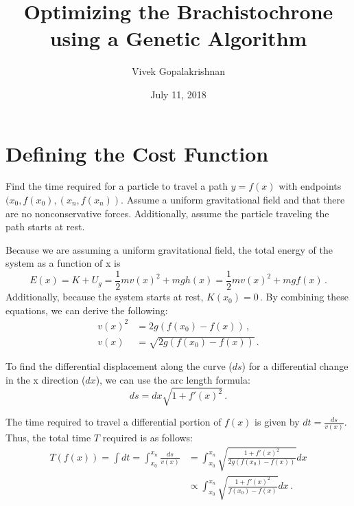 \documentclass{article}
\title{Optimizing the Brachistochrone using a Genetic Algorithm}
\author{Vivek Gopalakrishnan}
\date{July 11, 2018}
\begin{document}
\maketitle

\section{Defining the Cost Function}
Find the time required for a particle to travel a path $y=f(x)$ with endpoints $(x_0,f(x_0), (x_n, f(x_n))$. Assume a uniform gravitational field and that there are no nonconservative forces. Additionally, assume the particle traveling the path starts at rest.

Because we are assuming a uniform gravitational field, the total energy of the system as a function of x is
\begin{equation}
	E(x) = K + U_g = \frac{1}{2}mv(x)^2 + mgh(x) = \frac{1}{2}mv(x)^2 + mgf(x) \,.
\end{equation}
Additionally, because the system starts at rest, $K(x_0)=0 \,.$
\noindent
By combining these equations, we can derive the following:
\begin{equation}
	\begin{split}
		v(x)^2 &= 2g(f(x_0) - f(x)) \,, \\
		v(x) &= \sqrt{2g(f(x_0) - f(x))} \,.
	\end{split}
\end{equation}

\noindent
To find the differential displacement along the curve ($ds$) for a differential change in the x direction ($dx$), we can use the arc length formula:
\begin{equation}
	ds = dx \sqrt{1 + f'(x)^2} \,.
\end{equation}

The time required to travel a differential portion of $f(x)$ is given by $dt = \frac{ds}{v(x)}$. Thus, the total time $T$ required is as follows:
\begin{equation}
	\begin{split}
		T(f(x)) = \int{dt} = \int_{x_0}^{x_n} \frac{ds}{v(x)} &= \int_{x_0}^{x_n} \sqrt{\frac{1 + f'(x)^2}{2g(f(x_0) - f(x))}}dx \\
				        &\propto \int_{x_0}^{x_n} \sqrt{\frac{1 + f'(x)^2}{f(x_0) - f(x)}}dx \,.
	\end{split}
\end{equation}
\end{document}
